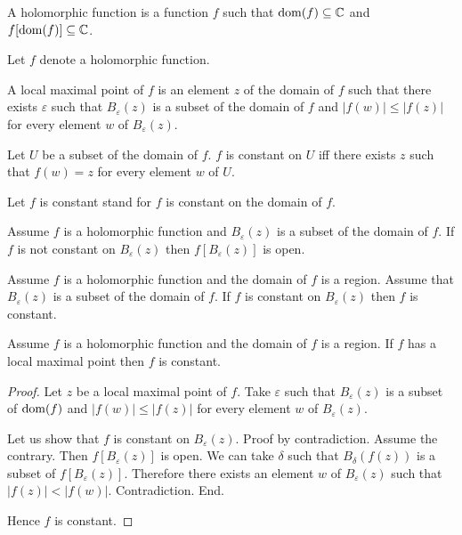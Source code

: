 \documentclass{article}
\newcommand{\Ball}[2]{B_{#1}(#2)}
\begin{document}
\begin{forthel}
\begin{signature}
  A holomorphic function is a function $f$ such that $\operatorname{dom}(f) \subseteq \mathbb{C}$
  and $f[\operatorname{dom}(f)] \subseteq \mathbb{C}$.
\end{signature}

Let $f$ denote a holomorphic function.

\begin{definition}
  A local maximal point of $f$ is an element $z$ of the domain of $f$ such that there exists
  $\varepsilon$ such that $\Ball{\varepsilon}{z}$ is a subset of the domain of $f$ and
  $|f(w)| \leq |f(z)|$ for every element $w$ of $\Ball{\varepsilon}{z}$.
\end{definition}

\begin{definition}
  Let $U$ be a subset of the domain of $f$. $f$ is constant on $U$ iff there exists
  $z$ such that $f(w) = z$ for every element $w$ of $U$.
\end{definition}

Let $f$ is constant stand for $f$ is constant on the domain of $f$.

\begin{axiom}
  Assume $f$ is a holomorphic function and $\Ball{\varepsilon}{z}$ is a subset of the domain of $f$.
  If $f$ is not constant on $\Ball{\varepsilon}{z}$
  then $f[\Ball{\varepsilon}{z}]$ is open.
\end{axiom}

\begin{axiom}
  Assume $f$ is a holomorphic function and the domain of $f$ is a region.
  Assume that $\Ball{\varepsilon}{z}$ is a subset of the domain of $f$.
  If $f$ is constant on $\Ball{\varepsilon}{z}$ then $f$ is constant.
\end{axiom}

\begin{proposition}
  Assume $f$ is a holomorphic function and the domain of $f$ is a region.
  If $f$ has a local maximal point then $f$ is constant.
\end{proposition}
\begin{proof}
  Let $z$ be a local maximal point of $f$.
  Take $\varepsilon$ such that
  $\Ball{\varepsilon}{z}$ is a subset of $\operatorname{dom}(f)$
  and $|f(w)| \leq |f(z)|$ for every element $w$ of $\Ball{\varepsilon}{z}$.

  Let us show that $f$ is constant on $\Ball{\varepsilon}{z}$.
  Proof by contradiction.
    Assume the contrary.
    Then $f[\Ball{\varepsilon}{z}]$ is open.
    We can take $\delta$ such that
    $\Ball{\delta}{f(z)}$ is a subset of $f[\Ball{\varepsilon}{z}]$.
    Therefore there exists an element $w$ of $\Ball{\varepsilon}{z}$ such that
    $|f(z)| < |f(w)|$.
    Contradiction.
  End.

  Hence $f$ is constant.
\end{proof}
\end{forthel}
\end{document}
